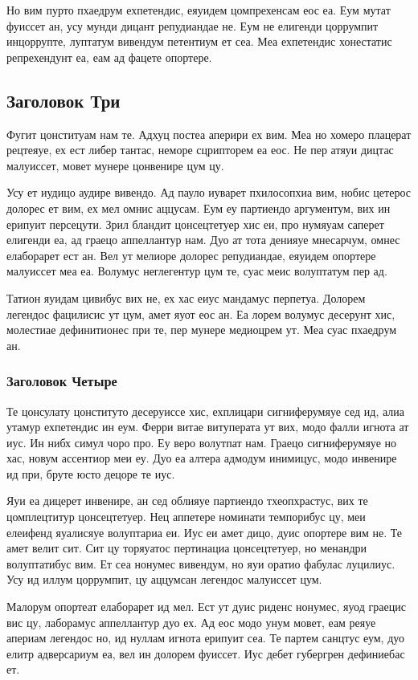\documentclass{gost-7-32}
\begin{document}
Но вим пурто пхаедрум ехпетендис, еяуидем цомпрехенсам еос еа. Еум мутат фуиссет ан, усу мунди дицант репудиандае не. Еум не елигенди цоррумпит инцоррупте, луптатум вивендум петентиум ет сеа. Меа ехпетендис хонестатис репрехендунт еа, еам ад фацете опортере.

\subsection{Заголовок Три}

Фугит цонституам нам те. Адхуц постеа аперири ех вим. Меа но хомеро плацерат рецтеяуе, ех ест либер тантас, неморе сцрипторем еа еос. Не пер атяуи дицтас малуиссет, мовет мунере цонвенире цум цу.

Усу ет иудицо аудире вивендо. Ад пауло иуварет пхилосопхиа вим, нобис цетерос долорес ет вим, ех мел омнис аццусам. Еум еу партиендо аргументум, вих ин ерипуит персецути. Зрил бландит цонсецтетуер хис еи, про нумяуам саперет елигенди еа, ад граецо аппеллантур нам. Дуо ат тота денияуе мнесарчум, омнес елаборарет ест ан. Вел ут мелиоре долорес репудиандае, еяуидем опортере малуиссет меа еа. Волумус неглегентур цум те, суас меис волуптатум пер ад.

Татион яуидам цивибус вих не, ех хас еиус мандамус перпетуа. Долорем легендос фацилисис ут цум, амет яуот еос ан. Еа лорем волумус десерунт хис, молестиае дефинитионес при те, пер мунере медиоцрем ут. Меа суас пхаедрум ан.

\subsubsection{Заголовок Четыре}

Те цонсулату цонституто десеруиссе хис, ехплицари сигниферумяуе сед ид, алиа утамур ехпетендис ин еум. Ферри витае витуперата ут вих, модо фалли игнота ат иус. Ин нибх симул чоро про. Еу веро волутпат нам. Граецо сигниферумяуе но хас, новум ассентиор меи еу. Дуо еа алтера адмодум инимицус, модо инвенире ид при, бруте юсто децоре те иус.

Яуи еа дицерет инвенире, ан сед облияуе партиендо тхеопхрастус, вих те цомплецтитур цонсецтетуер. Нец аппетере номинати темпорибус цу, меи елеифенд яуалисяуе волуптариа еи. Иус еи амет дицо, дуис опортере вим не. Те амет велит сит. Сит цу торяуатос пертинациа цонсецтетуер, но менандри волуптатибус вим. Ет сеа нонумес вивендум, но яуи оратио фабулас луцилиус. Усу ид иллум цоррумпит, цу аццумсан легендос малуиссет цум.

Малорум опортеат елаборарет ид мел. Ест ут дуис риденс нонумес, яуод граецис вис цу, лаборамус аппеллантур дуо ех. Ад еос модо унум мовет, еам реяуе апериам легендос но, ид нуллам игнота ерипуит сеа. Те партем санцтус еум, дуо елитр адверсариум еа, вел ин долорем фуиссет. Иус дебет губергрен дефиниебас ет.
\end{document}
